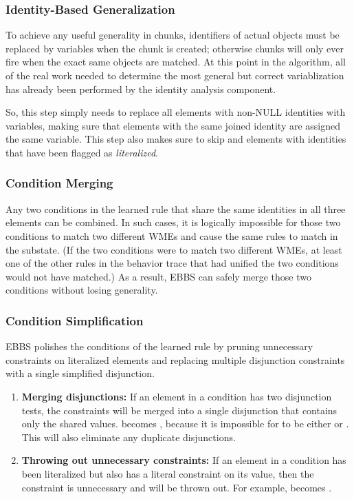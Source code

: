 \subsubsection{Identity-Based Generalization}

To achieve any useful generality in chunks, identifiers of actual objects must be replaced by variables when the chunk is created; otherwise chunks will only ever fire when the exact same objects are matched.  At this point in the algorithm, all of the real work needed to determine the most general but correct variablization has already been performed by the identity analysis component.

So, this step simply needs to replace all elements with non-NULL identities with variables, making sure that elements with the same joined identity are assigned the same variable.  This step also makes sure to skip and elements with identities that have been flagged as \textit{literalized}.

\subsubsection{Condition Merging}

Any two conditions in the learned rule that share the same identities in all three elements can be combined.  In such cases, it is logically impossible for those two conditions to match two different WMEs and cause the same rules to match in the substate.  (If the two conditions were to match two different WMEs, at least one of the other rules in the behavior trace that had unified the two conditions would not have matched.)  As a result, EBBS can safely merge those two conditions without losing generality.

\subsubsection{Condition Simplification}

EBBS polishes the conditions of the learned rule by pruning unnecessary constraints on literalized elements and replacing multiple disjunction constraints with a single simplified disjunction.

\begin{enumerate}
	\item \textbf{Merging disjunctions:}
	If an element in a condition has two disjunction tests, the constraints will be merged into a single disjunction that contains only the shared values.  becomes , because it is impossible for  to be either  or .  This will also eliminate any duplicate disjunctions.

	\item \textbf{Throwing out unnecessary constraints:}
	If an element in a condition has been literalized but also has a literal constraint on its value, then the constraint is unnecessary and will be thrown out.  For example,   becomes  .
\end{enumerate}

